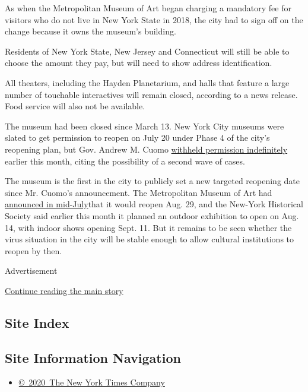 As when the Metropolitan Museum of Art began charging a mandatory fee
for visitors who do not live in New York State in 2018, the city had to
sign off on the change because it owns the museum's building.

Residents of New York State, New Jersey and Connecticut will still be
able to choose the amount they pay, but will need to show address
identification.

All theaters, including the Hayden Planetarium, and halls that feature a
large number of touchable interactives will remain closed, according to
a news release. Food service will also not be available.

The museum had been closed since March 13. New York City museums were
slated to get permission to reopen on July 20 under Phase 4 of the
city's reopening plan, but Gov. Andrew M. Cuomo
\href{https://www.nytimes.com/2020/07/17/arts/design/nyc-museums-phase-4.html}{withheld
permission indefinitely} earlier this month, citing the possibility of a
second wave of cases.

The museum is the first in the city to publicly set a new targeted
reopening date since Mr. Cuomo's announcement. The Metropolitan Museum
of Art had
\href{https://www.nytimes.com/2020/06/28/arts/museum-of-the-city-of-new-york-reduced-but-reopening.html}{announced
in mid-July}that it would reopen Aug. 29, and the New-York Historical
Society said earlier this month it planned an outdoor exhibition to open
on Aug. 14, with indoor shows opening Sept. 11. But it remains to be
seen whether the virus situation in the city will be stable enough to
allow cultural institutions to reopen by then.

Advertisement

\protect\hyperlink{after-bottom}{Continue reading the main story}

\hypertarget{site-index}{%
\subsection{Site Index}\label{site-index}}

\hypertarget{site-information-navigation}{%
\subsection{Site Information
Navigation}\label{site-information-navigation}}

\begin{itemize}
\tightlist
\item
  \href{https://help.nytimes.com/hc/en-us/articles/115014792127-Copyright-notice}{©~2020~The
  New York Times Company}
\end{itemize}

